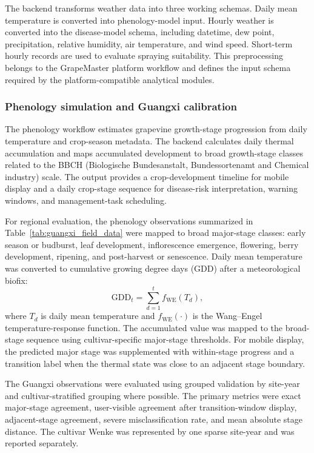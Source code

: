 \documentclass[12pt]{article}
\begin{document}
The backend transforms weather data into three working schemas. Daily mean temperature is converted into phenology-model input. Hourly weather is converted into the disease-model schema, including datetime, dew point, precipitation, relative humidity, air temperature, and wind speed. Short-term hourly records are used to evaluate spraying suitability. This preprocessing belongs to the GrapeMaster platform workflow and defines the input schema required by the platform-compatible analytical modules.

\subsubsection{Phenology simulation and Guangxi calibration}\label{phenology-simulation-and-guangxi-calibration}

The phenology workflow estimates grapevine growth-stage progression from daily temperature and crop-season metadata. The backend calculates daily thermal accumulation and maps accumulated development to broad growth-stage classes related to the BBCH (Biologische Bundesanstalt, Bundessortenamt and Chemical industry) scale. The output provides a crop-development timeline for mobile display and a daily crop-stage sequence for disease-risk interpretation, warning windows, and management-task scheduling.

For regional evaluation, the phenology observations summarized in Table~\ref{tab:guangxi_field_data} were mapped to broad major-stage classes: early season or budburst, leaf development, inflorescence emergence, flowering, berry development, ripening, and post-harvest or senescence. Daily mean temperature was converted to cumulative growing degree days (GDD) after a meteorological biofix:
\begin{equation}
\mathrm{GDD}_{t}
=
\sum_{d=1}^{t} f_{\mathrm{WE}}\left(T_{d}\right),
\label{eq:phenology_gdd}
\end{equation}
where \(T_d\) is daily mean temperature and \(f_{\mathrm{WE}}(\cdot)\) is the Wang--Engel temperature-response function. The accumulated value was mapped to the broad-stage sequence using cultivar-specific major-stage thresholds. For mobile display, the predicted major stage was supplemented with within-stage progress and a transition label when the thermal state was close to an adjacent stage boundary.

The Guangxi observations were evaluated using grouped validation by site-year and cultivar-stratified grouping where possible. The primary metrics were exact major-stage agreement, user-visible agreement after transition-window display, adjacent-stage agreement, severe misclassification rate, and mean absolute stage distance. The cultivar Wenke was represented by one sparse site-year and was reported separately.
\end{document}
